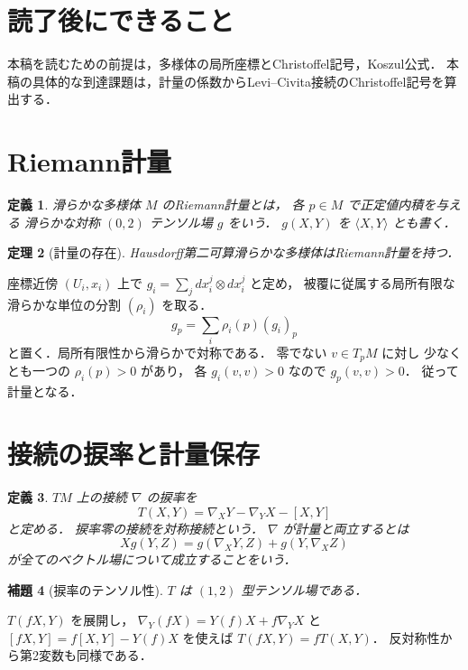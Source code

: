 \documentclass[a5paper,10pt,onecolumn]{jsarticle}
\makeatletter
\theoremstyle{mathnotetheorem}
\newtheorem{theorem}{定理}[section]
\newtheorem{definition}[theorem]{定義}
\newtheorem{lemma}[theorem]{補題}
\renewcommand{\proofname}{証明}
\renewenvironment{proof}[1][\proofname]{%
  \par\pushQED{\qed}\normalfont\topsep4\p@\@plus2\p@\relax
  \trivlist\item[\hskip\labelsep\bfseries #1]\ignorespaces
}{\popQED\endtrivlist\@endpefalse}
\makeatother
\begin{document}
\section*{読了後にできること}
本稿を読むための前提は，多様体の局所座標とChristoffel記号，Koszul公式．
本稿の具体的な到達課題は，計量の係数からLevi--Civita接続のChristoffel記号を算出する．


\section{Riemann計量}
\begin{definition}
滑らかな多様体 $M$ のRiemann計量とは，
各 $p\in M$ で正定値内積を与える
滑らかな対称 $(0,2)$ テンソル場 $g$ をいう．
$g(X,Y)$ を $\langle X,Y\rangle$ とも書く．
\end{definition}
\begin{theorem}[計量の存在]\label{thm:exists}
Hausdorff第二可算滑らかな多様体はRiemann計量を持つ．
\end{theorem}
\begin{proof}
座標近傍 $(U_i,x_i)$ 上で
$g_i=\sum_jdx_i^j\otimes dx_i^j$ と定め，
被覆に従属する局所有限な滑らかな単位の分割 $(\rho_i)$ を取る．
\[
 g_p=\sum_i\rho_i(p)(g_i)_p
\]
と置く．局所有限性から滑らかで対称である．
零でない $v\in T_pM$ に対し
少なくとも一つの $\rho_i(p)>0$ があり，
各 $g_i(v,v)>0$ なので $g_p(v,v)>0$．
従って計量となる．
\end{proof}
\section{接続の捩率と計量保存}
\begin{definition}
$TM$ 上の接続 $\nabla$ の捩率を
\[
 T(X,Y)=\nabla_XY-\nabla_YX-[X,Y]
\]
と定める．
捩率零の接続を対称接続という．
$\nabla$ が計量と両立するとは
\[
 Xg(Y,Z)=g(\nabla_XY,Z)+g(Y,\nabla_XZ)
\]
が全てのベクトル場について成立することをいう．
\end{definition}
\begin{lemma}[捩率のテンソル性]
$T$ は $(1,2)$ 型テンソル場である．
\end{lemma}
\begin{proof}
$T(fX,Y)$ を展開し，
$\nabla_Y(fX)=Y(f)X+f\nabla_YX$ と
$[fX,Y]=f[X,Y]-Y(f)X$ を使えば
$T(fX,Y)=fT(X,Y)$．
反対称性から第2変数も同様である．
\end{proof}
\end{document}
